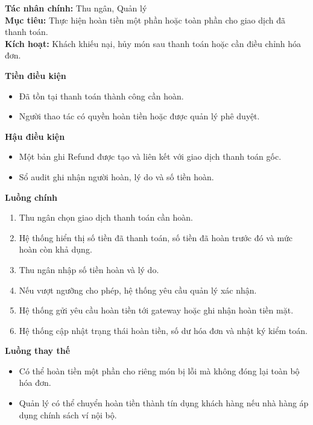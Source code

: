 \documentclass[11pt,a4paper]{article}
\begin{document}
    \begin{usecasebox}[title={UC-PAY-03 --- Hoàn tiền}]
    \textbf{Tác nhân chính:} Thu ngân, Quản lý\\
    \textbf{Mục tiêu:} Thực hiện hoàn tiền một phần hoặc toàn phần cho giao dịch đã thanh toán.\\
    \textbf{Kích hoạt:} Khách khiếu nại, hủy món sau thanh toán hoặc cần điều chỉnh hóa đơn.

    \medskip
    \textbf{Tiền điều kiện}
    \begin{itemize}[leftmargin=1.8em]
  \item Đã tồn tại thanh toán thành công cần hoàn.
  \item Người thao tác có quyền hoàn tiền hoặc được quản lý phê duyệt.
\end{itemize}

    \textbf{Hậu điều kiện}
    \begin{itemize}[leftmargin=1.8em]
  \item Một bản ghi \textsf{Refund} được tạo và liên kết với giao dịch thanh toán gốc.
  \item Sổ audit ghi nhận người hoàn, lý do và số tiền hoàn.
\end{itemize}

    \textbf{Luồng chính}
    \begin{enumerate}[leftmargin=1.8em]
  \item Thu ngân chọn giao dịch thanh toán cần hoàn.
  \item Hệ thống hiển thị số tiền đã thanh toán, số tiền đã hoàn trước đó và mức hoàn còn khả dụng.
  \item Thu ngân nhập số tiền hoàn và lý do.
  \item Nếu vượt ngưỡng cho phép, hệ thống yêu cầu quản lý xác nhận.
  \item Hệ thống gửi yêu cầu hoàn tiền tới gateway hoặc ghi nhận hoàn tiền mặt.
  \item Hệ thống cập nhật trạng thái hoàn tiền, số dư hóa đơn và nhật ký kiểm toán.
\end{enumerate}

    \textbf{Luồng thay thế}
    \begin{itemize}[leftmargin=1.8em]
  \item Có thể hoàn tiền một phần cho riêng món bị lỗi mà không đóng lại toàn bộ hóa đơn.
  \item Quản lý có thể chuyển hoàn tiền thành tín dụng khách hàng nếu nhà hàng áp dụng chính sách ví nội bộ.
\end{itemize}


\end{usecasebox}
\end{document}
